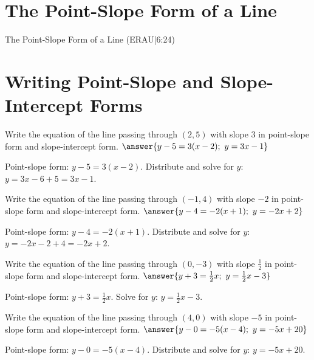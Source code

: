 \documentclass{ximera}
\begin{document}

\section*{The Point-Slope Form of a Line}

The Point-Slope Form of a Line (ERAU|6:24)



\section*{Writing Point-Slope and Slope-Intercept Forms}

\begin{problem}
Write the equation of the line passing through $(2, 5)$ with slope $3$ in point-slope form and slope-intercept form. $\answer{y - 5 = 3(x - 2);\ y = 3x - 1}$
\begin{feedback}
Point-slope form: $y - 5 = 3(x - 2)$. Distribute and solve for $y$: $y = 3x - 6 + 5 = 3x - 1$.
\end{feedback}
\end{problem}

\begin{problem}
Write the equation of the line passing through $(-1, 4)$ with slope $-2$ in point-slope form and slope-intercept form. $\answer{y - 4 = -2(x + 1);\ y = -2x + 2}$
\begin{feedback}
Point-slope form: $y - 4 = -2(x + 1)$. Distribute and solve for $y$: $y = -2x - 2 + 4 = -2x + 2$.
\end{feedback}
\end{problem}

\begin{problem}
Write the equation of the line passing through $(0, -3)$ with slope $\frac{1}{2}$ in point-slope form and slope-intercept form. $\answer{y + 3 = \frac{1}{2}x;\ y = \frac{1}{2}x - 3}$
\begin{feedback}
Point-slope form: $y + 3 = \frac{1}{2}x$. Solve for $y$: $y = \frac{1}{2}x - 3$.
\end{feedback}
\end{problem}

\begin{problem}
Write the equation of the line passing through $(4, 0)$ with slope $-5$ in point-slope form and slope-intercept form. $\answer{y - 0 = -5(x - 4);\ y = -5x + 20}$
\begin{feedback}
Point-slope form: $y - 0 = -5(x - 4)$. Distribute and solve for $y$: $y = -5x + 20$.
\end{feedback}
\end{problem}
\end{document}
